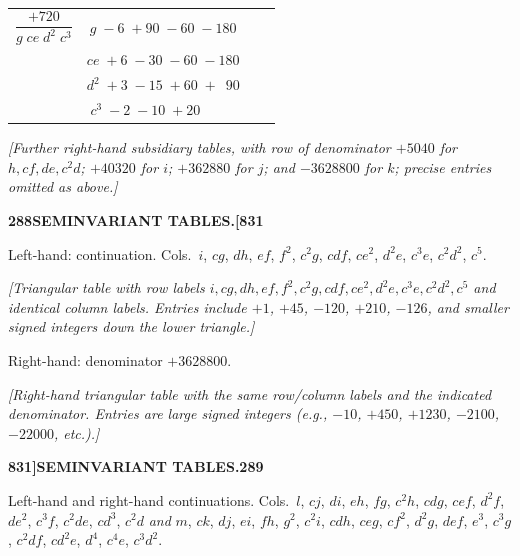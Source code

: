 \documentclass[11pt]{article}
\begin{document}
\begin{center}
\begin{tabular}{c|ccc}
$\dfrac{+720}{g\;ce\;d^{2}\;c^{3}}$ & $g \;-6\;+90\;-60\;-180$ \\
                                    & $ce\;+6\;-30\;-60\;-180$ \\
                                    & $d^{2}\;+3\;-15\;+60\;+\phantom{0}90$ \\
                                    & $c^{3}\;-2\;-10\;+20\;\phantom{+000}$ \\
\end{tabular}
\end{center}

\medskip

\noindent\textit{[Further right-hand subsidiary tables, with row of denominator $+5040$ for $h, cf, de, c^{2}d$; $+40320$ for $i$; $+362880$ for $j$; and $-3628800$ for $k$; precise entries omitted as above.]}

\bigskip

\newpage

\noindent\textbf{288}\hfill\textbf{SEMINVARIANT TABLES.}\hfill\textbf{[831}

\bigskip

\noindent Left-hand: continuation. Cols.\ $i$, $cg$, $dh$, $ef$, $f^{2}$, $c^{2}g$, $cdf$, $ce^{2}$, $d^{2}e$, $c^{3}e$, $c^{2}d^{2}$, $c^{5}$.

\medskip

\noindent\textit{[Triangular table with row labels $i, cg, dh, ef, f^{2}, c^{2}g, cdf, ce^{2}, d^{2}e, c^{3}e, c^{2}d^{2}, c^{5}$ and identical column labels. Entries include $+1$, $+45$, $-120$, $+210$, $-126$, and smaller signed integers down the lower triangle.]}

\bigskip

\noindent Right-hand: denominator $+3628800$.

\medskip

\noindent\textit{[Right-hand triangular table with the same row/column labels and the indicated denominator. Entries are large signed integers (e.g., $-10$, $+450$, $+1230$, $-2100$, $-22000$, etc.).]}

\bigskip

\newpage

\noindent\textbf{831]}\hfill\textbf{SEMINVARIANT TABLES.}\hfill\textbf{289}

\bigskip

\noindent Left-hand and right-hand continuations. Cols.\ $l$, $cj$, $di$, $eh$, $fg$, $c^{2}h$, $cdg$, $cef$, $d^{2}f$, $de^{2}$, $c^{3}f$, $c^{2}de$, $cd^{3}$, $c^{2}d$ \emph{and} $m$, $ck$, $dj$, $ei$, $fh$, $g^{2}$, $c^{2}i$, $cdh$, $ceg$, $cf^{2}$, $d^{2}g$, $def$, $e^{3}$, $c^{3}g$, $c^{2}df$, $cd^{2}e$, $d^{4}$, $c^{4}e$, $c^{3}d^{2}$.
\end{document}
